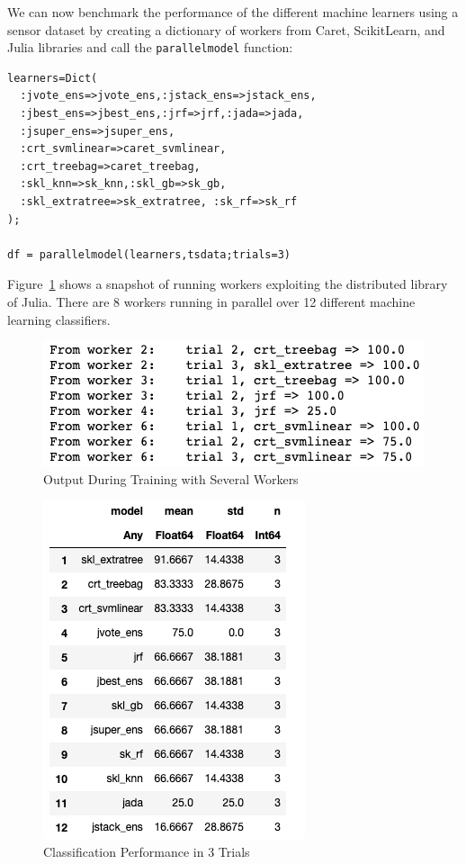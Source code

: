 \documentclass{juliacon}
\begin{document}
We can now benchmark the performance of the different machine learners using a sensor dataset by creating a dictionary of workers from Caret, ScikitLearn, and Julia libraries and call the \texttt{parallelmodel} function:

\begin{lstlisting}
learners=Dict(
  :jvote_ens=>jvote_ens,:jstack_ens=>jstack_ens,
  :jbest_ens=>jbest_ens,:jrf=>jrf,:jada=>jada,
  :jsuper_ens=>jsuper_ens, 
  :crt_svmlinear=>caret_svmlinear,
  :crt_treebag=>caret_treebag,
  :skl_knn=>sk_knn,:skl_gb=>sk_gb,
  :skl_extratree=>sk_extratree, :sk_rf=>sk_rf
);

df = parallelmodel(learners,tsdata;trials=3)
\end{lstlisting}

Figure~\ref{fig:sim}  shows a snapshot of running workers exploiting the distributed library of Julia. There are 8 workers running in parallel over 12 different machine learning classifiers.

\begin{figure}[htbp]
   \centering
   \includegraphics[width=0.8\columnwidth]{sim.png} %
   \caption{Output During Training with Several Workers}
   \label{fig:sim}
\end{figure}

\begin{figure}[htbp]
   \centering
   \includegraphics[width=0.6\columnwidth]{results.png} %
   \caption{Classification Performance in 3 Trials}
   \label{fig:performance}
\end{figure}
\end{document}

